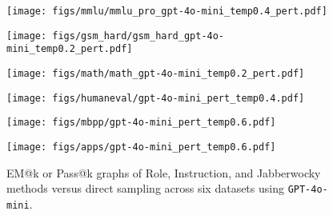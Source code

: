  \begin{figure*}[ht]
    \centering
    
    \begin{minipage}{0.32\textwidth}
        \texttt{[image: figs/mmlu/mmlu\_pro\_gpt-4o-mini\_temp0.4\_pert.pdf]}
        \label{fig:pert_4omini_mmlu}
    \end{minipage}
    \hfill
    \begin{minipage}{0.32\textwidth}
        \texttt{[image: figs/gsm\_hard/gsm\_hard\_gpt-4o-mini\_temp0.2\_pert.pdf]}
        \label{fig:pert_4omini_gsm_hard}
    \end{minipage}
    \hfill
    \begin{minipage}{0.32\textwidth}
        \texttt{[image: figs/math/math\_gpt-4o-mini\_temp0.2\_pert.pdf]}
       \label{fig:pert_4omini_math}
    \end{minipage}

    \begin{minipage}{0.32\textwidth}
        \texttt{[image: figs/humaneval/gpt-4o-mini\_pert\_temp0.4.pdf]}
        \label{fig:pert_4omini_humaneval}
    \end{minipage}
    \hfill
    \begin{minipage}{0.32\textwidth}
        \texttt{[image: figs/mbpp/gpt-4o-mini\_pert\_temp0.6.pdf]}
        \label{fig:pert_4omini_mbpp}
    \end{minipage}
    \hfill
    \begin{minipage}{0.32\textwidth}
        \texttt{[image: figs/apps/gpt-4o-mini\_pert\_temp0.6.pdf]}
        \label{fig:pert_4omini_apps}
    \end{minipage}
    \caption{EM@k or Pass@k graphs of Role, Instruction, and Jabberwocky methods versus direct sampling across six datasets using \texttt{GPT-4o-mini}.}
    \label{fig:pert_4omini}
\end{figure*}